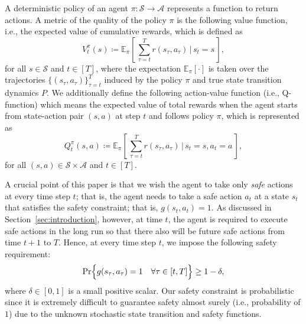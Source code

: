 \documentclass[letterpaper]{article} %
\newcommand{\E}{\mathbb{E}}
\newcommand{\cA}{\mathcal{A}}
\newcommand{\cS}{\mathcal{S}}
\newcommand{\sind}[3]{{#1}^{#2}_{#3}}
\begin{document}
A deterministic policy of an agent $\pi: \cS \rightarrow \cA$ represents a function to return actions. 
A metric of the quality of the policy $\pi$ is the following value function, i.e., the expected value of cumulative rewards, which is defined as
%
\begin{equation*}
 \sind{V}{\pi}{t}(s) \coloneqq \E_{\pi} \left[\, \sum_{\tau=t}^T r(s_\tau, a_\tau)  \, \bigg | \, s_t = s \,\right],
\end{equation*}
%
for all $s \in \cS$ and $t \in [T]$,
where the expectation $\E_\pi[\cdot]$ is taken over the trajectories $\{(s_\tau, a_\tau)\}_{\tau=t}^T$ induced by the policy $\pi$ and true state transition dynamics $P$.
%
We additionally define the following action-value function (i.e., Q-function) which means the expected value of total rewards when the agent starts
from state-action pair $(s,a)$ at step $t$ and follows policy $\pi$, which is represented as 
%
\begin{equation*}
    \sind{Q}{\pi}{t}(s,a) \coloneqq \E_{\pi} \left[\, \sum_{\tau=t}^T r(s_\tau, a_\tau) \, \bigg |\, s_t = s, a_t = a \,\right],
\end{equation*}
%
for all $(s,a) \in \cS\times \cA$ and $t \in [T]$.

A crucial point of this paper is that we wish the agent to take only \textit{safe} actions at every time step $t$; that is, the agent needs to take a safe action $a_t$ at a state $s_t$ that satisfies the safety constraint; that is, $g(s_t, a_t) = 1$.
As discussed in Section~\ref{sec:introduction}, however, at time $t$, the agent is required to execute safe actions in the long run so that there also will be future safe actions from time $t+1$ to $T$.
Hence, at every time step $t$, we impose the following safety requirement:
%
\begin{equation}
    \label{eq:constraint}
    \Pr \Bigl\{ g(s_\tau, a_\tau) = 1 \quad \forall \tau \in [t, T] \Big\} \ge 1 - \delta,
\end{equation}
%
where $\delta \in [0, 1]$ is a small positive scalar.
Our safety constraint is probabilistic since it is extremely difficult to guarantee safety almost surely (i.e., probability of $1$) due to the unknown stochastic state transition and safety functions.
\end{document}
